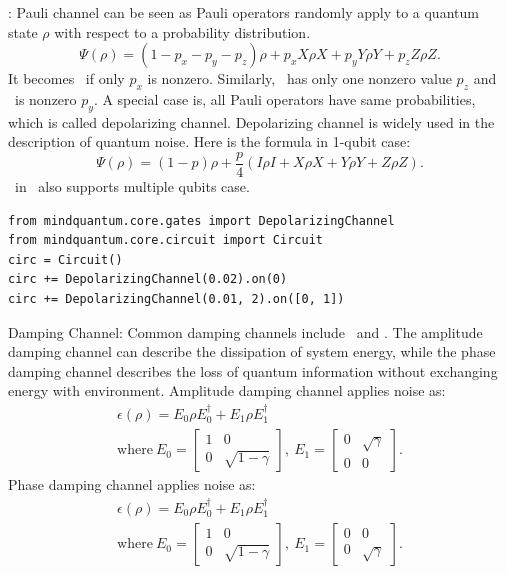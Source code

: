 \PauliChannel: Pauli channel can be seen as Pauli operators randomly apply to a quantum state $\rho$ with respect to a probability distribution.
\begin{equation}
    \Psi(\rho) = (1-p_x-p_y-p_z) \rho + p_x X \rho X + p_y Y \rho Y + p_z Z \rho Z.
\end{equation}
It becomes \BitFlipChannel\ if only $p_x$ is nonzero. Similarly, \PhaseFlipChannel\ has only one nonzero value $p_z$ and \BitPhaseFlipChannel\ is nonzero $p_y$. A special case is, all Pauli operators have same probabilities, which is called depolarizing channel. Depolarizing channel is widely used in the description of quantum noise. Here is the formula in 1-qubit case:
\begin{equation}
    \Psi(\rho) =  (1-p) \rho + \frac{p}{4}(I\rho I+X\rho X+Y\rho Y+Z\rho Z).
\end{equation}
\DepolarizingChannel\ in \MindQuantum\ also supports multiple qubits case.
\begin{lstlisting}
from mindquantum.core.gates import DepolarizingChannel
from mindquantum.core.circuit import Circuit
circ = Circuit()
circ += DepolarizingChannel(0.02).on(0)
circ += DepolarizingChannel(0.01, 2).on([0, 1])
\end{lstlisting}

Damping Channel: Common damping channels include \AmplitudeDampingChannel\ and \PhaseDampingChannel. The amplitude damping channel can describe the dissipation of system energy, while the phase damping channel describes the loss of quantum information without exchanging energy with environment.
Amplitude damping channel applies noise as:
\begin{gather*}
    \epsilon(\rho) = E_0 \rho E_0^\dagger + E_1 \rho E_1^\dagger
    \\
    \text{where}\ {E_0}=\begin{bmatrix}1 & 0               \\
        0 & \sqrt{1-\gamma}\end{bmatrix},
    \ {E_1}=\begin{bmatrix}0 & \sqrt{\gamma} \\
        0 & 0\end{bmatrix}.
\end{gather*}
Phase damping channel applies noise as:
\begin{gather*}
    \epsilon(\rho) = E_0 \rho E_0^\dagger + E_1 \rho E_1^\dagger
    \\
    \text{where}\ {E_0}=\begin{bmatrix}1 & 0               \\
        0 & \sqrt{1-\gamma}\end{bmatrix},
    \ {E_1}=\begin{bmatrix}0 & 0             \\
        0 & \sqrt{\gamma}\end{bmatrix}.
\end{gather*}

